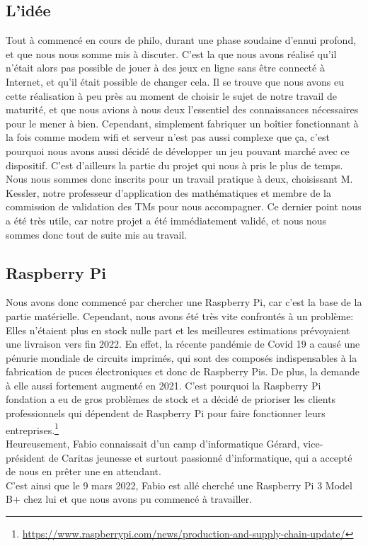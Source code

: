 \documentclass[a4paper]{article}
\begin{document}
\subsection{L’idée}
Tout à commencé en cours de philo, durant une phase soudaine d'ennui profond, et que nous nous somme mis à discuter. C'est la que nous avons réalisé qu'il n’était alors pas possible de jouer à des jeux en ligne sans être connecté à Internet, et qu'il était possible de changer cela. Il se trouve que nous avons eu cette réalisation à peu près au moment de choisir le sujet de notre travail de maturité, et que nous avions à nous deux l’essentiel des connaissances nécessaires pour le mener à bien. Cependant, simplement fabriquer un boîtier fonctionnant à la fois comme modem wifi et serveur n’est pas aussi complexe que ça, c’est pourquoi nous avons aussi décidé de développer un jeu pouvant marché avec ce dispositif. C’est d’ailleurs la partie du projet qui nous à pris le plus de temps.
Nous nous sommes donc inscrits pour un travail pratique à deux, choisissant M. Kessler, notre professeur d’application des mathématiques et membre de la commission de validation des TMs pour nous accompagner. Ce dernier point nous a été très utile, car notre projet a été immédiatement validé, et nous nous sommes donc tout de suite mis au travail.

\subsection{Raspberry Pi}
Nous avons donc commencé par chercher une Raspberry Pi\cite{raspberry}, car c'est la base de la partie matérielle. Cependant, nous avons été très vite confrontés à un problème: Elles n'étaient plus en stock nulle part et les meilleures estimations prévoyaient une livraison vers fin 2022. En effet, la récente pandémie de Covid 19 a causé une pénurie mondiale de circuits imprimés, qui sont des composés indispensables à la fabrication de puces électroniques et donc de Raspberry Pis. De plus, la demande à elle aussi fortement augmenté en 2021. C'est pourquoi la Raspberry Pi fondation a eu de gros problèmes de stock et a décidé de prioriser les clients professionnels qui dépendent de Raspberry Pi pour faire fonctionner leurs entreprises.\footnote{\url{https://www.raspberrypi.com/news/production-and-supply-chain-update/}} \\
Heureusement, Fabio connaissait d'un camp d'informatique Gérard, vice-président de Caritas jeunesse et surtout passionné d'informatique, qui a accepté de nous en prêter une en attendant. \\
C'est ainsi que le 9 mars 2022, Fabio est allé cherché une Raspberry Pi 3 Model B+ chez lui et que nous avons pu commencé à travailler.
\end{document}
